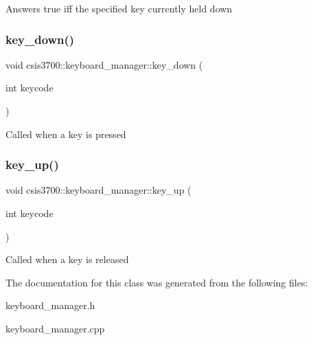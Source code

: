 Answers true iff the specified key currently held down \mbox{\label{classcsis3700_1_1keyboard__manager_aae677b5185c2d235b589767c4e3e6098}} 
\subsubsection{\texorpdfstring{key\+\_\+down()}{key\_down()}}
{\footnotesize\ttfamily void csis3700\+::keyboard\+\_\+manager\+::key\+\_\+down (\begin{DoxyParamCaption}\item[{int}]{keycode }\end{DoxyParamCaption})}

Called when a key is pressed \mbox{\label{classcsis3700_1_1keyboard__manager_a970b26d49eb327f582ac28ac6caa0f36}} 
\subsubsection{\texorpdfstring{key\+\_\+up()}{key\_up()}}
{\footnotesize\ttfamily void csis3700\+::keyboard\+\_\+manager\+::key\+\_\+up (\begin{DoxyParamCaption}\item[{int}]{keycode }\end{DoxyParamCaption})}

Called when a key is released 

The documentation for this class was generated from the following files\+:\begin{DoxyCompactItemize}
\item 
keyboard\+\_\+manager.\+h\item 
keyboard\+\_\+manager.\+cpp\end{DoxyCompactItemize}
